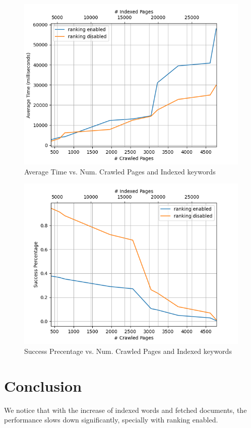 \documentclass[12pt]{IEEEtran}
\begin{document}
\begin{figure}
  \centering
  \includegraphics[width=\linewidth]{avgtime.png}
  \caption{Average Time vs. Num. Crawled Pages and Indexed keywords}
  \label{fig:avgtime}
\end{figure}

\begin{figure}
  \centering
  \includegraphics[width=\linewidth]{secPrec.png}
  \caption{Success Precentage vs. Num. Crawled Pages and Indexed keywords}
  \label{fig:secPrec}
\end{figure}

\section{Conclusion}
We notice that with the increase of indexed words and fetched documents, the performance slows down significantly, specially with ranking enabled.
\end{document}
